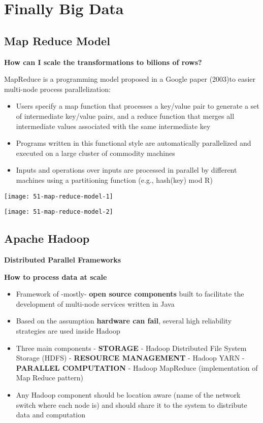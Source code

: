 \section{Finally Big Data}

\subsection{Map Reduce Model}

\textbf{How can I scale the transformations to bilions of rows?}

MapReduce is a programming model proposed in a Google paper (2003)to easier multi-node process parallelization:

\begin{itemize}
	\item Users specify a map function that processes a key/value pair to generate a set of intermediate key/value pairs, and a reduce function that merges all intermediate values associated with the same intermediate key
	\item Programs written in this functional style are automatically parallelized and executed on a large cluster of commodity machines
	\item Inputs and operations over inputs are processed in parallel by different machines using a partitioning function (e.g., hash(key) mod R)
\end{itemize}  

\begin{center}
\texttt{[image: 51-map-reduce-model-1]}
\end{center}

\begin{center}
\texttt{[image: 51-map-reduce-model-2]}
\end{center}

\subsection{Apache Hadoop}

\textbf{Distributed Parallel Frameworks}

\textbf{How to process data at scale}

\begin{itemize}
	\item Framework of -mostly- \textbf{open source components} built to facilitate the development of multi-node services written in Java
	\item Based on the assumption \textbf{hardware can fail}, several high reliability strategies are used inside Hadoop
	\item Three main components
	- \textbf{STORAGE} - Hadoop Distributed File System Storage (HDFS)
	- \textbf{RESOURCE MANAGEMENT} - Hadoop YARN
	- \textbf{PARALLEL COMPUTATION} - Hadoop MapReduce (implementation of Map Reduce pattern)
	\item Any Hadoop component should be location aware (name of the network switch where each node is) and should share it to the system to distribute data and computation
\end{itemize}


